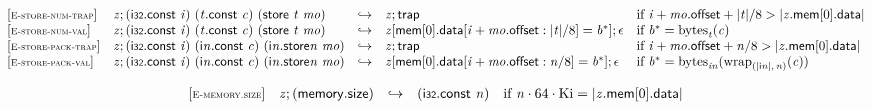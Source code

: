 $$
\begin{array}{@{}l@{}lcl@{}l@{}}
{[\textsc{\scriptsize E{-}store{-}num{-}trap}]} \quad & {\mathit{z}} ; (\mathsf{i{\scriptstyle32}}.\mathsf{const}~{\mathit{i}})~({\mathit{t}}.\mathsf{const}~{\mathit{c}})~(\mathsf{store}~{\mathit{t}}~{\mathit{mo}}) &\hookrightarrow& {\mathit{z}} ; \mathsf{trap} &\quad
  \mbox{if}~{\mathit{i}} + {\mathit{mo}}.\mathsf{offset} + {|{\mathit{t}}|} / 8 > {|{{\mathit{z}}.\mathsf{mem}}{[0]}.\mathsf{data}|} \\
{[\textsc{\scriptsize E{-}store{-}num{-}val}]} \quad & {\mathit{z}} ; (\mathsf{i{\scriptstyle32}}.\mathsf{const}~{\mathit{i}})~({\mathit{t}}.\mathsf{const}~{\mathit{c}})~(\mathsf{store}~{\mathit{t}}~{\mathit{mo}}) &\hookrightarrow& {\mathit{z}}[\mathsf{mem}[0].\mathsf{data}[{\mathit{i}} + {\mathit{mo}}.\mathsf{offset} : {|{\mathit{t}}|} / 8] = {{\mathit{b}}^\ast}] ; \epsilon &\quad
  \mbox{if}~{{\mathit{b}}^\ast} = {{\mathrm{bytes}}}_{{\mathit{t}}}({\mathit{c}}) \\
{[\textsc{\scriptsize E{-}store{-}pack{-}trap}]} \quad & {\mathit{z}} ; (\mathsf{i{\scriptstyle32}}.\mathsf{const}~{\mathit{i}})~({\mathsf{i}}{{\mathit{n}}}.\mathsf{const}~{\mathit{c}})~({{\mathsf{i}}{{\mathit{n}}}.\mathsf{store}}{{\mathit{n}}}~{\mathit{mo}}) &\hookrightarrow& {\mathit{z}} ; \mathsf{trap} &\quad
  \mbox{if}~{\mathit{i}} + {\mathit{mo}}.\mathsf{offset} + {\mathit{n}} / 8 > {|{{\mathit{z}}.\mathsf{mem}}{[0]}.\mathsf{data}|} \\
{[\textsc{\scriptsize E{-}store{-}pack{-}val}]} \quad & {\mathit{z}} ; (\mathsf{i{\scriptstyle32}}.\mathsf{const}~{\mathit{i}})~({\mathsf{i}}{{\mathit{n}}}.\mathsf{const}~{\mathit{c}})~({{\mathsf{i}}{{\mathit{n}}}.\mathsf{store}}{{\mathit{n}}}~{\mathit{mo}}) &\hookrightarrow& {\mathit{z}}[\mathsf{mem}[0].\mathsf{data}[{\mathit{i}} + {\mathit{mo}}.\mathsf{offset} : {\mathit{n}} / 8] = {{\mathit{b}}^\ast}] ; \epsilon &\quad
  \mbox{if}~{{\mathit{b}}^\ast} = {{\mathrm{bytes}}}_{{{\mathit{i}}}{{\mathit{n}}}}({{{\mathrm{wrap}}}_{({|{\mathsf{i}}{{\mathit{n}}}|},\, {\mathit{n}})}}{({\mathit{c}})}) \\
\end{array}
$$

\vspace{1ex}

$$
\begin{array}{@{}l@{}lcl@{}l@{}}
{[\textsc{\scriptsize E{-}memory.size}]} \quad & {\mathit{z}} ; (\mathsf{memory.size}) &\hookrightarrow& (\mathsf{i{\scriptstyle32}}.\mathsf{const}~{\mathit{n}}) &\quad
  \mbox{if}~{\mathit{n}} \cdot 64 \cdot {\mathrm{Ki}} = {|{{\mathit{z}}.\mathsf{mem}}{[0]}.\mathsf{data}|} \\
\end{array}
$$

